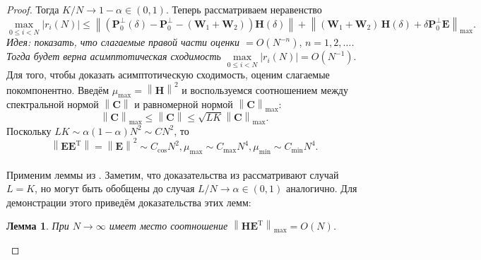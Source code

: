 \documentclass[specialist,
substylefile = spbu_report.rtx,
subf,href,colorlinks=true, 12pt]{disser}
\newcommand\norm[1]{\left\|#1\right\|}
\newtheorem{lemma}{Лемма}
\begin{document}
	\begin{proof}
		Тогда $K/N \rightarrow 1 - \alpha \in (0,1)$. 
		Теперь рассматриваем неравенство
		\begin{equation*}
			\max_{0\leqslant i<N} |r_i(N)|\leqslant \norm{(\mathbf{P}_0^\bot(\delta)- \mathbf{P}_0^\bot-(\mathbf{W}_1+\mathbf{W}_2))\mathbf{H}(\delta)} + \norm{ (\mathbf{W}_1+\mathbf{W}_2)\, \mathbf{H}(\delta) + \delta \mathbf{P}_0^\perp \mathbf{E}}_{\max}.
		\end{equation*}
		\emph{Идея: показать, что слагаемые правой части оценки $= O(N^{-n}),\,n=1,2,\dots$. Тогда будет верна асимптотическая сходимость $\max\limits_{0\leqslant i < N}|r_i(N)|=O(N^{-1})$}.
		\\
		Для того, чтобы доказать асимптотическую сходимость, оценим слагаемые покомпонентно. Введём $\mu_{\max} = \norm{\mathbf{H}}^2$ и воспользуемся соотношением между спектральной нормой $\norm{\mathbf{C}}$ и равномерной нормой $\norm{\mathbf{C}}_{\max}$:
		\begin{equation*}
			\norm{\mathbf{C}}_{\max} \leqslant\norm{\mathbf{C} }\leqslant \sqrt{LK}\norm{\mathbf{C}}_{\max}.
		\end{equation*}
		Поскольку $LK\sim \alpha(1-\alpha)N^2\sim CN^2$, то \begin{equation}
			\norm{\mathbf{EE}^\mathrm{T}} = \norm{\mathbf{E}}^2\sim C_{\cos}N^2, \mu_{\max} \sim C_{\max}N^4, \mu_{\min} \sim C_{\min}N^4.\label{eq:asymp_1}
		\end{equation}
		\\Применим леммы из \cite{ZNekrutkin}. Заметим, что доказательства из \cite{ZNekrutkin}  рассматривают случай $L=K$, но могут быть обобщены до случая $L/N\rightarrow\alpha\in(0,1)$ аналогично. Для демонстрации этого приведём доказательства этих лемм:
		\begin{lemma}\label{lem:2}
			При $N\rightarrow\infty$ имеет место соотношение $\norm{\mathbf{HE}^\mathrm{T}}_{\max} = O(N)$.
		\end{lemma}
		

\end{proof}
\end{document}
